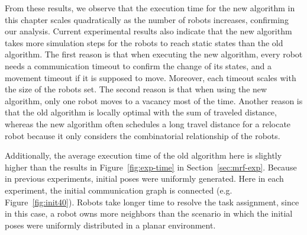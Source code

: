 From these results, we observe that the execution time for the new
algorithm in this chapter scales quadratically as the number of robots increases,
confirming our analysis.  
  Current experimental results also indicate that
  the new algorithm takes more simulation steps for the robots to reach
  static states than the old algorithm. 
  The first reason is that when
  executing the new algorithm, every robot needs a communication timeout
  to confirm the change of its states, and a movement timeout if it is
  supposed to move. 
  Moreover, each timeout scales with the size of the
  robots set. 
  The second reason is that when using the new algorithm,
  only one robot moves to a vacancy most of the time. 
  Another reason is
  that the old algorithm is locally optimal with the sum of traveled
  distance, whereas the new algorithm often schedules a long travel distance for a relocate robot because it only considers the combinatorial relationship of the robots.
  
  Additionally, the average execution time of the old algorithm here is slightly higher than the results in Figure~\ref{fig:exp-time} in Section~\ref{sec:mrf-exp}. 
  Because in previous experiments, initial poses were uniformly generated. 
  Here in each experiment, the initial communication graph is connected (e.g. Figure~\ref{fig:init40}).
  Robots take longer time to resolve the task assignment, since in this case,
  a robot owns more neighbors than the scenario in which the initial poses were uniformly distributed in a planar environment.
  
